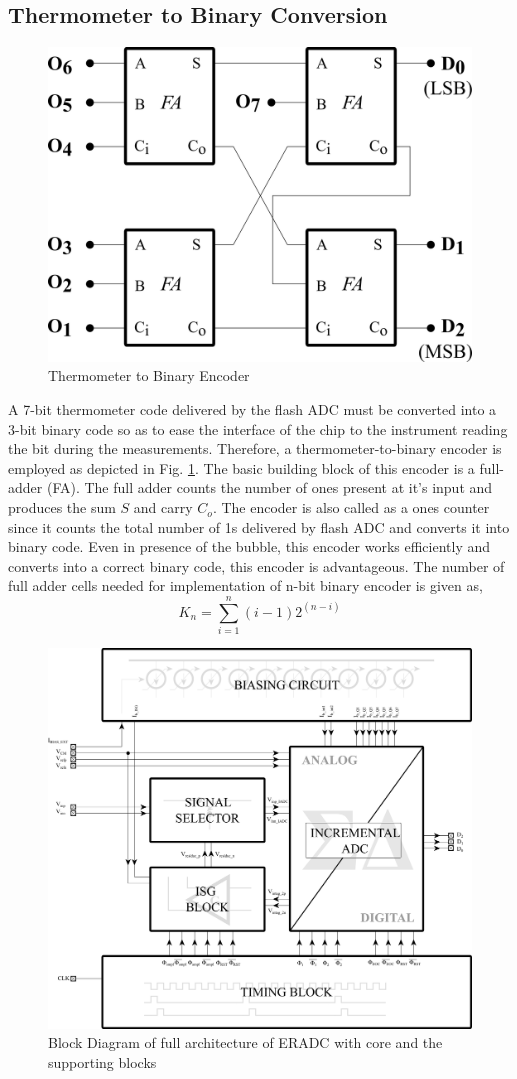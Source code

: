 \subsection{Thermometer to Binary Conversion}
%
\begin{figure}[h!]
\centering
\includegraphics[width=0.5\columnwidth]{Chap05/Figures/wallece_tree.png}
\caption{Thermometer to Binary Encoder}
\label{fig:wallece_tree}
\end{figure}
%
A 7-bit thermometer code delivered by the flash ADC must be converted into a 3-bit binary code so as to ease the interface of the chip to the instrument reading the bit during the measurements. Therefore, a thermometer-to-binary encoder is employed as depicted in Fig. \ref{fig:wallece_tree}. The basic building block of this encoder is a full-adder (FA). The full adder counts the number of ones present at it's input and produces the sum $S$ and carry $C_o$. The encoder is also called as a ones counter since it counts the total number of 1s delivered by flash ADC and converts it into binary code. Even in presence of the bubble, this encoder works efficiently and converts into a correct binary code, this encoder is advantageous. The number of full adder cells needed for implementation of n-bit binary encoder is given as,
%
\begin{equation}
    K_n = \sum^{n}_{i=1}\left(i-1\right)2^{(n-i)}
\end{equation}
%

\begin{figure}[h!]
\centering
\includegraphics[width=\columnwidth]{Chap05/Figures/block_diagram.png}
\caption{Block Diagram of full architecture of ERADC with core and the supporting blocks}
\label{fig:block_diagram}
\end{figure}